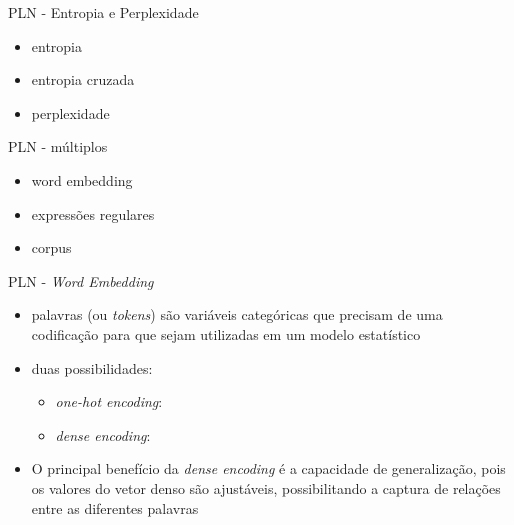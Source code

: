 \documentclass{beamer}
\begin{document}
    \begin{frame}{PLN - Entropia e Perplexidade}
        \begin{itemize}
            \item entropia
            \item entropia cruzada
            \item perplexidade
        \end{itemize}
    \end{frame}

    \begin{frame}{PLN - múltiplos}
        \begin{itemize}
            \item word embedding
            \item expressões regulares
            \item corpus
        \end{itemize}
    \end{frame}

    \begin{frame}{PLN - \textit{Word Embedding}}
        \begin{itemize}
            \item palavras (ou \textit{tokens}) são variáveis categóricas que precisam de uma codificação para que sejam utilizadas em um modelo estatístico
            \item duas possibilidades:
            \begin{itemize}
                \item \textit{one-hot encoding}:
                \item \textit{dense encoding}:
            \end{itemize}
            \item O principal benefício da \textit{dense encoding} é a capacidade de generalização, pois os valores do vetor denso são ajustáveis, possibilitando a captura de relações entre as diferentes palavras
        \end{itemize}
    \end{frame}

\end{document}
